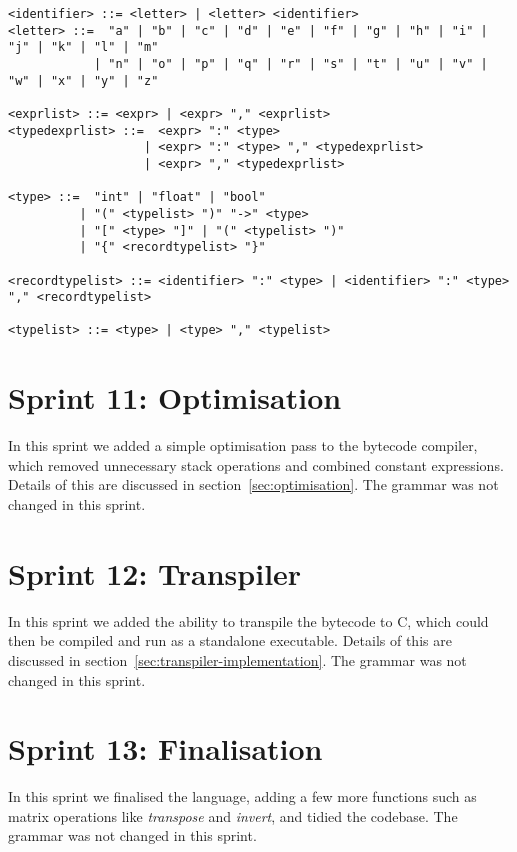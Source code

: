 \begin{verbatim}
<identifier> ::= <letter> | <letter> <identifier>
<letter> ::=  "a" | "b" | "c" | "d" | "e" | "f" | "g" | "h" | "i" | "j" | "k" | "l" | "m" 
            | "n" | "o" | "p" | "q" | "r" | "s" | "t" | "u" | "v" | "w" | "x" | "y" | "z"

<exprlist> ::= <expr> | <expr> "," <exprlist>
<typedexprlist> ::=  <expr> ":" <type> 
                   | <expr> ":" <type> "," <typedexprlist>
                   | <expr> "," <typedexprlist>
    
<type> ::=  "int" | "float" | "bool" 
          | "(" <typelist> ")" "->" <type> 
          | "[" <type> "]" | "(" <typelist> ")"
          | "{" <recordtypelist> "}"
          
<recordtypelist> ::= <identifier> ":" <type> | <identifier> ":" <type> "," <recordtypelist>

<typelist> ::= <type> | <type> "," <typelist>
\end{verbatim}

\section{Sprint 11: Optimisation}\label{sec:optimisation1}

In this sprint we added a simple optimisation pass to the bytecode compiler, which removed unnecessary stack operations
and combined constant expressions.
Details of this are discussed in section~\ref{sec:optimisation}.
The grammar was not changed in this sprint.

\section{Sprint 12: Transpiler}\label{sec:transpiler1}

In this sprint we added the ability to transpile the bytecode to C, which could then be compiled and run as a standalone
executable.
Details of this are discussed in section~\ref{sec:transpiler-implementation}.
The grammar was not changed in this sprint.

\section{Sprint 13: Finalisation}\label{sec:finalisation1}

In this sprint we finalised the language, adding a few more functions such as matrix operations like 
\textit{transpose} and \textit{invert}, and tidied the codebase.
The grammar was not changed in this sprint.
